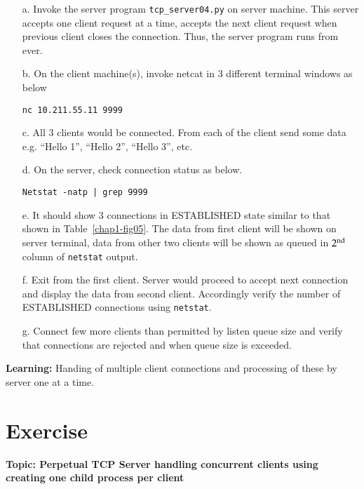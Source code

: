 \begin{multicols}{2}
\begin{itemize}

\item[a.] Invoke the server program \texttt{tcp\_server04.py} on server machine. This server accepts one client request at a time, accepts the next client request when previous client closes the connection. Thus, the server program runs from ever.

\item[b.] On the client machine(s), invoke netcat in 3 different terminal windows as below

\texttt{nc 10.211.55.11 9999}

\item[c.] All 3 clients would be connected. From each of the client send some data e.g. “Hello 1”, “Hello 2”, “Hello 3”, etc.

\item[d.] On the server, check connection status as below.

\texttt{Netstat -natp | grep 9999}

\item[e.] It should show 3 connections in ESTABLISHED state similar to that shown in Table~\ref{chap1-fig05}. The data from first client will be shown on server terminal, data from other two clients will be shown as queued in $2^{\rm nd}$ column of \texttt{netstat} output.

\item[f.] Exit from the first client. Server would proceed to accept next connection and display the data from second client. Accordingly verify the number of ESTABLISHED connections using \texttt{netstat}.

\item[g.] Connect few more clients than permitted by listen queue size and verify that connections are rejected and when queue size is exceeded.

\end{itemize}

\textbf{Learning:} Handing of multiple client connections and processing of these by server one at a time.

\section*{Exercise \label{chap1-exe03}}

\textbf{Topic: Perpetual TCP Server handling concurrent clients using creating one child process per client}


\end{multicols}
